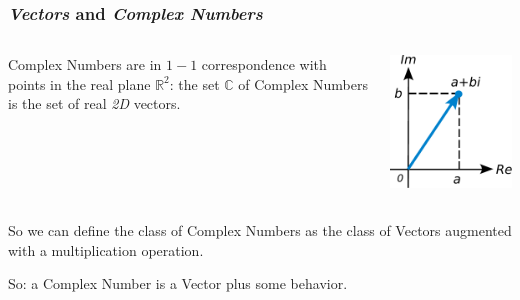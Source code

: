 \documentclass[english,serif,mathserif,xcolor=pdftex,dvipsnames,table]{beamer}
\begin{document}
\begin{frame}
  \frametitle{\emph{Vectors} and \emph{Complex Numbers}}

  \begin{columns}
    \begin{column}{0.6\linewidth}
      \raggedleft
      Complex Numbers are in $1-1$ correspondence with
      points in the real plane $\mathbb{R}^2$: the set $\mathbb{C}$ of
      Complex Numbers is the set of real \emph{2D} vectors.
    \end{column}
    \begin{column}{0.4\linewidth}
      \centering
      \includegraphics[height=7\baselineskip]{fig/ComplexNumber}
    \end{column}
  \end{columns}

  \+
  So we can define the class of Complex Numbers as the class of
  Vectors augmented with a multiplication operation.

  \+
  So: a Complex Number is a Vector plus some behavior.
\end{frame}
\end{document}
